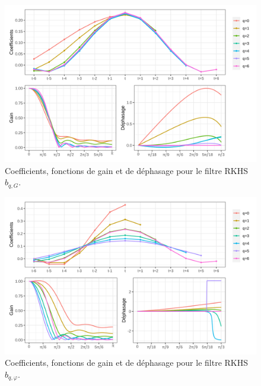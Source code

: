 \documentclass[
  12pt,
  french,
  12pt,a4paper]{article}
\newcommand\1{\mathds{1}}
\begin{document}
\begin{figure}[H]

{\centering \includegraphics[width=1\linewidth]{img/filters_used/gain} 

}

\caption[Coefficients, fonctions de gain et de déphasage pour le filtre RKHS \(b_{q,G}\)]{Coefficients, fonctions de gain et de déphasage pour le filtre RKHS \(b_{q,G}\).}\label{fig:graphsrkhsgain}

\footnotesize
\normalsize\end{figure}

\begin{figure}[H]

{\centering \includegraphics[width=1\linewidth]{img/filters_used/phase} 

}

\caption[Coefficients, fonctions de gain et de déphasage pour le filtre RKHS \(b_{q,\varphi}\)]{Coefficients, fonctions de gain et de déphasage pour le filtre RKHS \(b_{q,\varphi}\).}\label{fig:graphsrkhsphase}

\footnotesize
\normalsize\end{figure}
\end{document}

